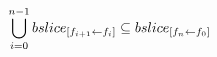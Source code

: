 \begin{equation}
\centering

\bigcup_{i=0}^{n-1} bslice_{[f_{i+1} \leftarrow f_i]} \subseteq bslice_{[f_n \leftarrow f_0]}
  
\label{eq:slice-unions}
\end{equation}